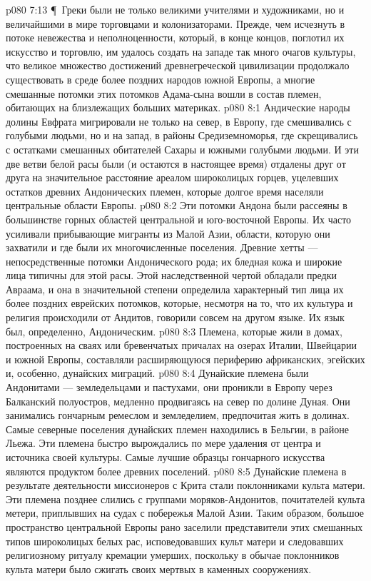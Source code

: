\vs p080 7:13 \P\ Греки были не только великими учителями и художниками, но и величайшими в мире торговцами и колонизаторами. Прежде, чем исчезнуть в потоке невежества и неполноценности, который, в конце концов, поглотил их искусство и торговлю, им удалось создать на западе так много очагов культуры, что великое множество достижений древнегреческой цивилизации продолжало существовать в среде более поздних народов южной Европы, а многие смешанные потомки этих потомков Адама\hyp{}сына вошли в состав племен, обитающих на близлежащих больших материках.
\vs p080 8:1 Андические народы долины Евфрата мигрировали не только на север, в Европу, где смешивались с голубыми людьми, но и на запад, в районы Средиземноморья, где скрещивались с остатками смешанных обитателей Сахары и южными голубыми людьми. И эти две ветви белой расы были (и остаются в настоящее время) отдалены друг от друга на значительное расстояние ареалом широколицых горцев, уцелевших остатков древних Андонических племен, которые долгое время населяли центральные области Европы.
\vs p080 8:2 Эти потомки Андона были рассеяны в большинстве горных областей центральной и юго\hyp{}восточной Европы. Их часто усиливали прибывающие мигранты из Малой Азии, области, которую они захватили и где были их многочисленные поселения. Древние хетты --- непосредственные потомки Андонического рода; их бледная кожа и широкие лица типичны для этой расы. Этой наследственной чертой обладали предки Авраама, и она в значительной степени определила характерный тип лица их более поздних еврейских потомков, которые, несмотря на то, что их культура и религия происходили от Андитов, говорили совсем на другом языке. Их язык был, определенно, Андоническим.
\vs p080 8:3 Племена, которые жили в домах, построенных на сваях или бревенчатых причалах на озерах Италии, Швейцарии и южной Европы, составляли расширяющуюся периферию африканских, эгейских и, особенно, дунайских миграций.
\vs p080 8:4 Дунайские племена были Андонитами --- земледельцами и пастухами, они проникли в Европу через Балканский полуостров, медленно продвигаясь на север по долине Дуная. Они занимались гончарным ремеслом и земледелием, предпочитая жить в долинах. Самые северные поселения дунайских племен находились в Бельгии, в районе Льежа. Эти племена быстро вырождались по мере удаления от центра и источника своей культуры. Самые лучшие образцы гончарного искусства являются продуктом более древних поселений.
\vs p080 8:5 Дунайские племена в результате деятельности миссионеров с Крита стали поклонниками культа матери. Эти племена позднее слились с группами моряков\hyp{}Андонитов, почитателей культа метери, приплывших на судах с побережья Малой Азии. Таким образом, большое пространство центральной Европы рано заселили представители этих смешанных типов широколицых белых рас, исповедовавших культ матери и следовавших религиозному ритуалу кремации умерших, поскольку в обычае поклонников культа матери было сжигать своих мертвых в каменных сооружениях.
